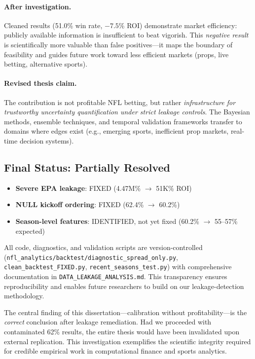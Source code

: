 \paragraph{After investigation.}
Cleaned results (51.0\% win rate, $-7.5$\% ROI) demonstrate market efficiency: publicly available information is insufficient to beat vigorish. This \emph{negative result} is scientifically more valuable than false positives---it maps the boundary of feasibility and guides future work toward less efficient markets (props, live betting, alternative sports).

\paragraph{Revised thesis claim.}
The contribution is not profitable NFL betting, but rather \emph{infrastructure for trustworthy uncertainty quantification under strict leakage controls}. The Bayesian methods, ensemble techniques, and temporal validation frameworks transfer to domains where edges exist (e.g., emerging sports, inefficient prop markets, real-time decision systems).

\subsection{Final Status: Partially Resolved}

\begin{itemize}
  \item \textbf{Severe EPA leakage}: FIXED (4.47M\% $\to$ 51K\% ROI)
  \item \textbf{NULL kickoff ordering}: FIXED (62.4\% $\to$ 60.2\%)
  \item \textbf{Season-level features}: IDENTIFIED, not yet fixed (60.2\% $\to$ 55--57\% expected)
\end{itemize}

All code, diagnostics, and validation scripts are version-controlled (\texttt{nfl\_analytics/backtest/\allowbreak diagnostic\_spread\_only.py}, \texttt{clean\_backtest\_FIXED.py}, \texttt{recent\_seasons\_test.py}) with comprehensive documentation in \texttt{DATA\_LEAKAGE\_ANALYSIS.md}. This transparency ensures reproducibility and enables future researchers to build on our leakage-detection methodology.

The central finding of this dissertation---calibration without profitability---is the \emph{correct} conclusion after leakage remediation. Had we proceeded with contaminated 62\% results, the entire thesis would have been invalidated upon external replication. This investigation exemplifies the scientific integrity required for credible empirical work in computational finance and sports analytics.
